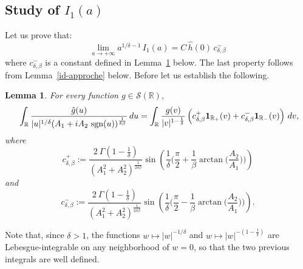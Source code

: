 \documentclass[oneside, a4paper,11pt,reqno]{amsart}
\newtheorem{lem}[hypo]{Lemma}
\begin{document}
\subsection{Study of $I_1(a)$} Let us prove that:  
$$ \lim_{a\rightarrow +\infty} a^{1/\delta-1}\, I_1(a) = C\, \hat h(0)\, c^-_{\delta,\beta}$$
where $c_{\delta,\beta}^-$ is a constant defined in Lemma~\ref{fourier-dist} below. The last property follows from Lemma~\ref{id-approche} below. Before let us establish the following.  
\begin{lem} \label{fourier-dist}
For every function $\displaystyle g\in{\mathcal S}({\mathbb R}),$
$$\ \int_{\mathbb R} \frac{\hat g(u)}{|u|^{1/\delta}(A_1+iA_2\ \text{\rm sgn}(u))^{\frac 1{\delta\beta}}}\, du = \int_{\mathbb R} \frac{g(v)}{|v|^{1-\frac 1\delta}} \left( c_{\delta,\beta}^{+} {\bf 1}_{{\mathbb{R}}_+}(v) + c_{\delta,\beta}^{-} {\bf 1}_{{\mathbb{R}}_-}(v)\right)\, dv,$$
where 
$$c_{\delta,\beta}^{+}:=  \frac{2\ \Gamma(1-\frac{1}{\delta})}{(A_1^2+A_2^2)^{\frac 1{2\delta\beta}}} \sin\left( \frac{1}{\delta}\Big(\frac{\pi}{2} + \frac{1}{\beta} \arctan 
\Big(\frac{A_2}{A_1}\Big)\Big) \right)$$
and
$$c_{\delta,\beta}^{-}:=  \frac{2\ \Gamma(1-\frac{1}{\delta})}{(A_1^2+A_2^2)^{\frac 1{2\delta\beta}}} \sin\left( \frac{1}{\delta}\Big(\frac{\pi}{2} - \frac{1}{\beta} \arctan 
\Big(\frac{A_2}{A_1}\Big)\Big) \right).$$
 
\end{lem}
\noindent Note that, since $\delta>1$, the functions $w\mapsto |w|^{-1/\delta}$ and $w\mapsto |w|^{-(1-\frac 1\delta)}$ are Lebesgue-integrable on any neighborhood of $w=0$, so that the two previous integrals  are well defined. 
\end{document}
